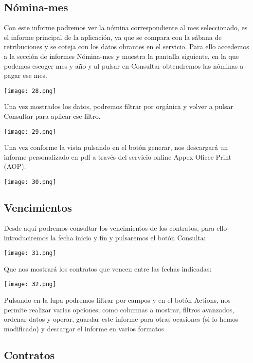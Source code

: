 \subsection{Nómina-mes}\label{nuxf3mina-mes}

Con este informe podremos ver la nómina correspondiente al mes seleccionado, es el informe principal de la aplicación, ya que se compara con la sábana de retribuciones y se coteja con los datos obrantes en el servicio. Para ello accedemos a la sección de informes Nómina-mes y muestra la pantalla siguiente, en la que podemos escoger mes y año y al pulsar en Consultar obtendremos las nóminas a pagar ese mes.

\texttt{[image: 28.png]}

Una vez mostrados los datos, podremos filtrar por orgánica y volver a pulsar Consultar para aplicar ese filtro.

\texttt{[image: 29.png]}

Una vez conforme la vista pulsando en el botón generar, nos descargará un informe personalizado en pdf a través del servicio online Appex Oficce Print (AOP).

\texttt{[image: 30.png]}

\subsection{Vencimientos}\label{vencimientos}

Desde aquí podremos consultar los vencimientos de los contratos, para ello introduciremos la fecha inicio y fin y pulsaremos el botón Consulta:

\texttt{[image: 31.png]}

Que nos mostrará los contratos que vencen entre las fechas indicadas:

\texttt{[image: 32.png]}

Pulsando en la lupa podremos filtrar por campos y en el botón Actions, nos permite realizar varias opciones; como columnas a mostrar, filtros avanzados, ordenar datos y operar, guardar este informe para otras ocasiones (si lo hemos modificado) y descargar el informe en varios formatos

\subsection{Contratos}\label{contratos-1}

